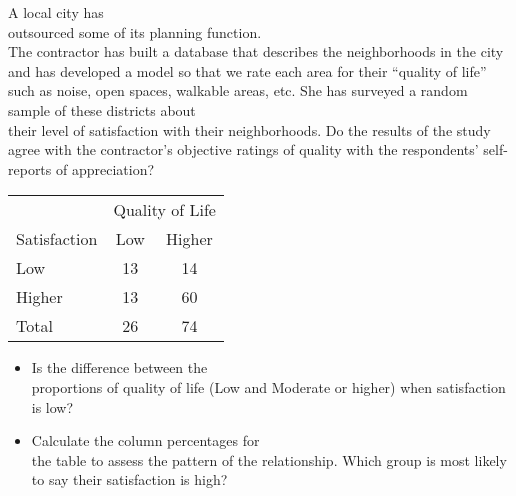 \documentclass[11pt]{book}\usepackage[]{graphicx}\usepackage[]{color}
\begin{document}
\begin{exercises}
  \begin{exercise}  %

 A local city has \\ outsourced some of its planning function.  \\ The contractor has built a database that describes the neighborhoods in the city and has developed a model so that we rate each area for their ``quality of life'' such as noise, open spaces, walkable areas, etc.  She has surveyed a random sample of these districts about \\ their level of satisfaction with their neighborhoods.   Do the results of the study agree with the contractor's objective ratings of quality with the respondents' self-reports of appreciation?

    \begin{table}[htbp]
   \centering
   \begin{tabular}{@{} lcc @{}} \hline %

    &  \multicolumn{2}{c}{Quality of Life} \\
    Satisfaction       & Low  & Higher  \\ \hline
    Low                & 13 & 14 \\
    Higher             & 13 & 60 \\ \hline
    Total              & 26 & 74 \\ \hline
    \end{tabular}
    \label{tab:c10_9}
  \end{table}

	  \begin{itemize}
	  \item Is the difference between the \\ proportions of quality of life (Low and Moderate or higher) when satisfaction is low?
	  \item Calculate the column percentages for \\ the table to assess the pattern of the relationship.  Which group is most likely to say their satisfaction is high?
	  \end{itemize}
	  \vspace{5mm}


\end{exercise}
\end{exercises}
\end{document}
